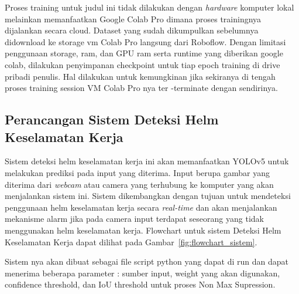 \par Proses training untuk judul ini tidak dilakukan dengan \emph{hardware} komputer lokal melainkan memanfaatkan Google Colab Pro dimana proses trainingnya dijalankan secara cloud. Dataset yang sudah dikumpulkan sebelumnya didownload ke storage vm Colab Pro langsung dari Roboflow.  Dengan limitasi penggunaan storage, ram, dan GPU ram serta runtime yang diberikan google colab, dilakukan penyimpanan checkpoint untuk tiap epoch training di drive pribadi penulis. Hal dilakukan untuk kemungkinan jika sekiranya di tengah proses training session VM Colab Pro nya ter -terminate dengan sendirinya. 

\subsection{Perancangan Sistem Deteksi Helm Keselamatan Kerja}
\label{subsec:hedect_dev_sys}


\par Sistem deteksi helm keselamatan kerja ini akan memanfaatkan YOLOv5 untuk melakukan prediksi pada input yang diterima. Input berupa gambar yang diterima dari \emph{webcam} atau camera yang terhubung ke komputer yang akan menjalankan sistem ini. Sistem dikembangkan dengan tujuan untuk mendeteksi penggunaan helm keselamatan kerja secara \emph{real-time} dan akan menjalankan mekanisme alarm jika pada camera input terdapat seseorang yang tidak menggunakan helm keselamatan kerja. Flowchart untuk sistem Deteksi Helm Keselamatan Kerja dapat dilihat pada Gambar~\ref{fig:flowchart_sistem}.


\par Sistem nya akan dibuat sebagai file script python yang dapat di run dan dapat menerima beberapa parameter :  sumber input, weight yang akan digunakan, confidence threshold, dan IoU threshold untuk proses Non Max Supression. 

